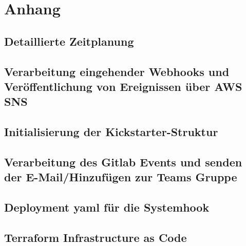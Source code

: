 \section{Anhang}
\subsection{Detaillierte Zeitplanung}
\label{app:Zeitplanung}

\clearpage


\clearpage


\clearpage



\clearpage

\clearpage


\clearpage

\subsection{Verarbeitung eingehender Webhooks und Veröffentlichung von Ereignissen über AWS SNS}
\label{app:CNMI}

\clearpage

\subsection{Initialisierung der Kickstarter-Struktur}
\label{app:kickStruct}

\clearpage

\subsection{Verarbeitung des Gitlab Events und senden der E-Mail/Hinzufügen zur Teams Gruppe}
\label{app:kickMain}

\clearpage

\subsection{Deployment yaml für die Systemhook}
\label{app:yamlFile}

\clearpage

\subsection{Terraform Infrastructure as Code}
\label{app:terraform}

\clearpage


\clearpage